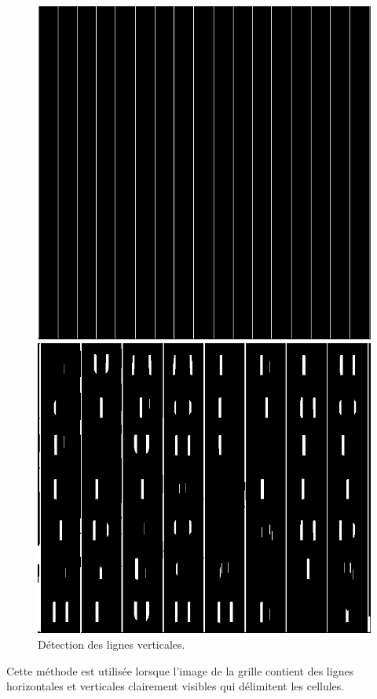 \documentclass{article}
\begin{document}
\begin{figure}[H]
  \centering
      \includegraphics[width=\linewidth]{ressources/1step_09_vertical_lines.png}
      \caption{}
    \endminipage\quad\quad\quad\quad
    \includegraphics[width=\linewidth]{ressources/3step_09_vertical_lines.png}
    \caption{}
  \endminipage
  \caption{Détection des lignes verticales.}
\end{figure}
Cette méthode est utilisée lorsque l'image de la grille contient des lignes horizontales et verticales clairement visibles qui délimitent les cellules.
\end{document}
